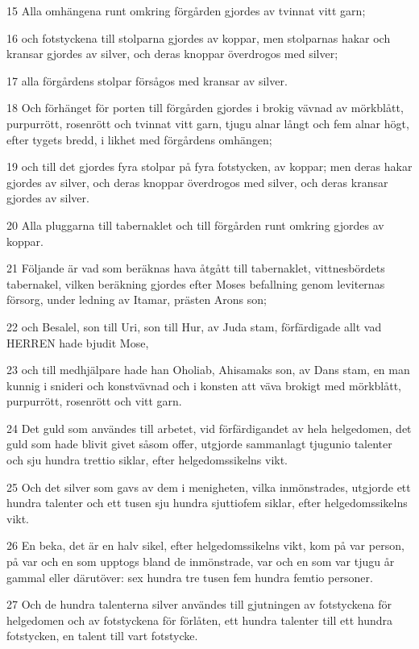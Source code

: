\par 15 Alla omhängena runt omkring förgården gjordes av tvinnat vitt garn;
\par 16 och fotstyckena till stolparna gjordes av koppar, men stolparnas hakar och kransar gjordes av silver, och deras knoppar överdrogos med silver;
\par 17 alla förgårdens stolpar försågos med kransar av silver.
\par 18 Och förhänget för porten till förgården gjordes i brokig vävnad av mörkblått, purpurrött, rosenrött och tvinnat vitt garn, tjugu alnar långt och fem alnar högt, efter tygets bredd, i likhet med förgårdens omhängen;
\par 19 och till det gjordes fyra stolpar på fyra fotstycken, av koppar; men deras hakar gjordes av silver, och deras knoppar överdrogos med silver, och deras kransar gjordes av silver.
\par 20 Alla pluggarna till tabernaklet och till förgården runt omkring gjordes av koppar.
\par 21 Följande är vad som beräknas hava åtgått till tabernaklet, vittnesbördets tabernakel, vilken beräkning gjordes efter Moses befallning genom leviternas försorg, under ledning av Itamar, prästen Arons son;
\par 22 och Besalel, son till Uri, son till Hur, av Juda stam, förfärdigade allt vad HERREN hade bjudit Mose,
\par 23 och till medhjälpare hade han Oholiab, Ahisamaks son, av Dans stam, en man kunnig i snideri och konstvävnad och i konsten att väva brokigt med mörkblått, purpurrött, rosenrött och vitt garn.
\par 24 Det guld som användes till arbetet, vid förfärdigandet av hela helgedomen, det guld som hade blivit givet såsom offer, utgjorde sammanlagt tjugunio talenter och sju hundra trettio siklar, efter helgedomssikelns vikt.
\par 25 Och det silver som gavs av dem i menigheten, vilka inmönstrades, utgjorde ett hundra talenter och ett tusen sju hundra sjuttiofem siklar, efter helgedomssikelns vikt.
\par 26 En beka, det är en halv sikel, efter helgedomssikelns vikt, kom på var person, på var och en som upptogs bland de inmönstrade, var och en som var tjugu år gammal eller därutöver: sex hundra tre tusen fem hundra femtio personer.
\par 27 Och de hundra talenterna silver användes till gjutningen av fotstyckena för helgedomen och av fotstyckena för förlåten, ett hundra talenter till ett hundra fotstycken, en talent till vart fotstycke.
